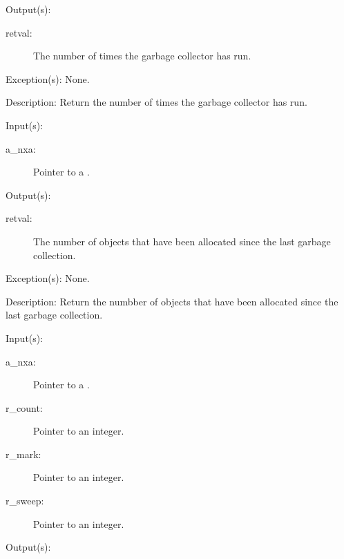 \begin{capi}
\begin{capilist}
\begin{description}
		\end{description}
	\item[Output(s): ]
		\begin{description}\item[]
		\item[retval: ]
			The number of times the garbage collector has run.
		\end{description}
	\item[Exception(s): ] None.
	\item[Description: ]
		Return the number of times the garbage collector has run.
	\end{capilist}
\label{nxa_new_get}
	\begin{capilist}
	\item[Input(s): ]
		\begin{description}\item[]
		\item[a\_nxa: ]
			Pointer to a .
		\end{description}
	\item[Output(s): ]
		\begin{description}\item[]
		\item[retval: ]
			The number of objects that have been allocated since the
			last garbage collection.
		\end{description}
	\item[Exception(s): ] None.
	\item[Description: ]
		Return the numbber of objects that have been allocated since the
		last garbage collection.
	\end{capilist}
\label{nxa_current_get}
	\begin{capilist}
	\item[Input(s): ]
		\begin{description}\item[]
		\item[a\_nxa: ]
			Pointer to a \classname{nxa}.
		\item[r\_count: ]
			Pointer to an integer.
		\item[r\_mark: ]
			Pointer to an integer.
		\item[r\_sweep: ]
			Pointer to an integer.
		\end{description}
	\item[Output(s): ]

\end{capilist}
\end{capi}
